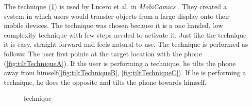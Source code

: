 The \tilt technique (\cref{fig:tiltTechnique}) is used by Lucero et al. in \emph{MobiComics} \cite{Lucero:2012}.
They created a system in which users would transfer objects from a large display onto their mobile devices.
The \tilt technique was chosen because it is a one handed, low complexity technique with few steps needed to activate it. 
Just like the \swipe technique it is easy, straight forward and feels natural to use. 
The \tilt technique is performed as follows:
The user first points at the target location with the phone (\cref{fig:tiltTechniqueA}).
If the user is performing a \push technique, he tilts the phone away from himself(\cref{fig:tiltTechniqueB}, \cref{fig:tiltTechniqueC}).
If he is performing a \pull technique, he does the opposite and tilts the phone towards himself. 

\begin{figure}[H]
	\caption{\push \tilt technique}
	\label{fig:tiltTechnique}
\end{figure}

